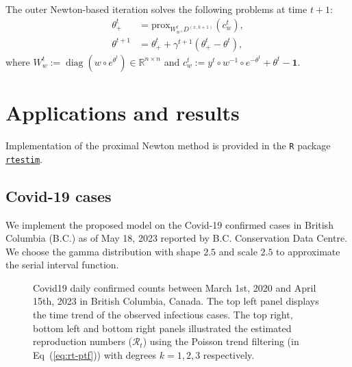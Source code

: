 \documentclass[10pt,letterpaper]{article}
\def\calR{\mathcal{R}}
\def\bbR{\mathbb{R}}
\DeclareMathOperator*{\diag}{diag}
\newcommand{\lr}[1]{\left(#1\right)}
\def\Dxkk{D^{(x,k+1)}}
\renewcommand{\eqref}[1]{Eq~(\ref{#1})}
\begin{document}
The outer Newton-based iteration solves the following problems at time $t+1$:
\begin{align} \label{spec-prox}
  \theta_+^t &= \mathrm{prox}_{W_w^t,\Dxkk} \lr{c_w^{t}}, \\
  \theta^{t+1} &= \theta_+^t + \gamma^{t+1} \lr{\theta_+^t - \theta^t},
\end{align}
where $W_w^t := \diag \lr{w\circ e^{\theta^t}}\in \bbR^{n\times n}$ and $c_w^t := y^t\circ w^{-1}\circ e^{-\theta^t} + \theta^t - \boldsymbol{1}$.%



\section*{Applications and results}

Implementation of the proximal Newton method is provided in the \texttt{R} package \href{https://dajmcdon.github.io/rtestim/}{\texttt{rtestim}}. 

\subsection*{Covid-19 cases}

We implement the proposed model on the Covid-19 confirmed cases in British Columbia (B.C.) as of May 18, 2023 reported by B.C. Conservation Data Centre. We choose the gamma distribution with shape $2.5$ and scale $2.5$ to approximate the serial interval function.

\begin{figure}[tb]
    \centering
    \caption{Covid19 daily confirmed counts between March 1st, 2020 and April 15th, 2023 in British Columbia, Canada. The top left panel displays the time trend of the observed infectious cases. The top right, bottom left and bottom right panels illustrated the estimated reproduction numbers ($\calR_t$) using the Poisson trend filtering (in \eqref{eq:rt-ptf}) with degrees $k=1,2,3$ respectively.} 
\end{figure}
\end{document}
